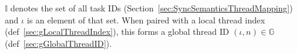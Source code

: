 
$\mathbb{I}$ denotes the set of all task IDs (Section~\ref{sec:SyncSemanticsThreadMapping}) and $\iota$ is an element of that set.
When paired with a local thread index (def~\ref{sec:gLocalThreadIndex}), this forms a global thread ID $(\iota, n) \in \mathbb{G}$ (def~\ref{sec:gGlobalThreadID}).




